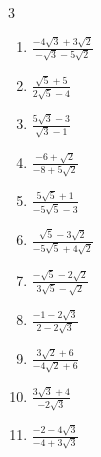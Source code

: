 \begin{multicols}{3}
\begin{enumerate}
  \item $\displaystyle \frac{-4\sqrt{3}+3\sqrt{2}}{-\sqrt{3}-5\sqrt{2}}$


  \item $\displaystyle \frac{\sqrt{5}+5}{2\sqrt{5}-4}$


  \item $\displaystyle \frac{5\sqrt{3}-3}{\sqrt{3}-1}$


  \item $\displaystyle \frac{-6+\sqrt{2}}{-8+5\sqrt{2}}$


\columnbreak %

  \item $\displaystyle \frac{5\sqrt{5}+1}{-5\sqrt{5}-3}$


  \item $\displaystyle \frac{\sqrt{5}-3\sqrt{2}}{-5\sqrt{5}+4\sqrt{2}}$


  \item $\displaystyle \frac{-\sqrt{5}-2\sqrt{2}}{3\sqrt{5}-\sqrt{2}}$


  \item $\displaystyle \frac{-1-2\sqrt{3}}{2-2\sqrt{3}}$


  \item $\displaystyle \frac{3\sqrt{2}+6}{-4\sqrt{2}+6}$


\columnbreak %

\resetques

  \item $\displaystyle \frac{3\sqrt{3}+4}{-2\sqrt{3}}$


  \item $\displaystyle \frac{-2-4\sqrt{3}}{-4+3\sqrt{3}}$


\end{enumerate}
\end{multicols}
